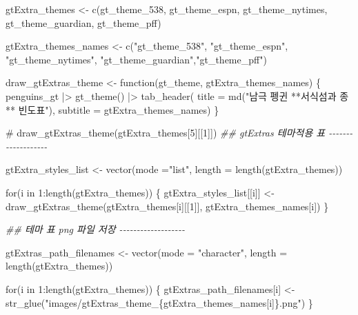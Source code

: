 \documentclass[
  letterpaper,
]{book}
\newenvironment{Shaded}{\begin{snugshade}}{\end{snugshade}}
\newcommand{\AttributeTok}[1]{\textcolor[rgb]{0.40,0.45,0.13}{#1}}
\newcommand{\CommentTok}[1]{\textcolor[rgb]{0.37,0.37,0.37}{#1}}
\newcommand{\ControlFlowTok}[1]{\textcolor[rgb]{0.00,0.23,0.31}{#1}}
\newcommand{\DecValTok}[1]{\textcolor[rgb]{0.68,0.00,0.00}{#1}}
\newcommand{\DocumentationTok}[1]{\textcolor[rgb]{0.37,0.37,0.37}{\textit{#1}}}
\newcommand{\FunctionTok}[1]{\textcolor[rgb]{0.28,0.35,0.67}{#1}}
\newcommand{\NormalTok}[1]{\textcolor[rgb]{0.00,0.23,0.31}{#1}}
\newcommand{\OtherTok}[1]{\textcolor[rgb]{0.00,0.23,0.31}{#1}}
\newcommand{\SpecialCharTok}[1]{\textcolor[rgb]{0.37,0.37,0.37}{#1}}
\newcommand{\StringTok}[1]{\textcolor[rgb]{0.13,0.47,0.30}{#1}}
\begin{document}
\begin{Shaded}
\begin{Highlighting}[]
\NormalTok{gtExtra\_themes }\OtherTok{\textless{}{-}} \FunctionTok{c}\NormalTok{(gt\_theme\_538, gt\_theme\_espn, gt\_theme\_nytimes, gt\_theme\_guardian, gt\_theme\_pff)}

\NormalTok{gtExtra\_themes\_names }\OtherTok{\textless{}{-}} \FunctionTok{c}\NormalTok{(}\StringTok{"gt\_theme\_538"}\NormalTok{, }\StringTok{"gt\_theme\_espn"}\NormalTok{, }\StringTok{"gt\_theme\_nytimes"}\NormalTok{,}
                          \StringTok{"gt\_theme\_guardian"}\NormalTok{,}\StringTok{"gt\_theme\_pff"}\NormalTok{)}

\NormalTok{draw\_gtExtras\_theme }\OtherTok{\textless{}{-}} \ControlFlowTok{function}\NormalTok{(gt\_theme, gtExtra\_themes\_names) \{}
\NormalTok{  penguins\_gt }\SpecialCharTok{|\textgreater{}} 
    \FunctionTok{gt\_theme}\NormalTok{() }\SpecialCharTok{|\textgreater{}} 
    \FunctionTok{tab\_header}\NormalTok{(}
      \AttributeTok{title =} \FunctionTok{md}\NormalTok{(}\StringTok{"남극 펭귄 **서식섬과 종** 빈도표"}\NormalTok{),}
      \AttributeTok{subtitle =}\NormalTok{ gtExtra\_themes\_names)}
\NormalTok{\}}

\CommentTok{\# draw\_gtExtras\_theme(gtExtra\_themes[5][[1]])}
\DocumentationTok{\#\# gtExtras 테마적용 표 {-}{-}{-}{-}{-}{-}{-}{-}{-}{-}{-}{-}{-}{-}{-}{-}{-}{-}{-}}

\NormalTok{gtExtra\_styles\_list }\OtherTok{\textless{}{-}} \FunctionTok{vector}\NormalTok{(}\AttributeTok{mode =}\StringTok{"list"}\NormalTok{, }\AttributeTok{length =} \FunctionTok{length}\NormalTok{(gtExtra\_themes))}

\ControlFlowTok{for}\NormalTok{(i }\ControlFlowTok{in} \DecValTok{1}\SpecialCharTok{:}\FunctionTok{length}\NormalTok{(gtExtra\_themes)) \{}
\NormalTok{  gtExtra\_styles\_list[[i]] }\OtherTok{\textless{}{-}}  \FunctionTok{draw\_gtExtras\_theme}\NormalTok{(gtExtra\_themes[i][[}\DecValTok{1}\NormalTok{]], gtExtra\_themes\_names[i])}
\NormalTok{\}}

\DocumentationTok{\#\# 테마 표 png 파일 저장 {-}{-}{-}{-}{-}{-}{-}{-}{-}{-}{-}{-}{-}{-}{-}{-}{-}{-}{-}}

\NormalTok{gtExtras\_path\_filenames }\OtherTok{\textless{}{-}} \FunctionTok{vector}\NormalTok{(}\AttributeTok{mode =} \StringTok{"character"}\NormalTok{, }\AttributeTok{length =} \FunctionTok{length}\NormalTok{(gtExtra\_themes))}

\ControlFlowTok{for}\NormalTok{(i }\ControlFlowTok{in} \DecValTok{1}\SpecialCharTok{:}\FunctionTok{length}\NormalTok{(gtExtra\_themes)) \{}
\NormalTok{  gtExtras\_path\_filenames[i] }\OtherTok{\textless{}{-}}  \FunctionTok{str\_glue}\NormalTok{(}\StringTok{"images/gtExtras\_theme\_\{gtExtra\_themes\_names[i]\}.png"}\NormalTok{)}
\NormalTok{\}}


\end{Highlighting}
\end{Shaded}
\end{document}

